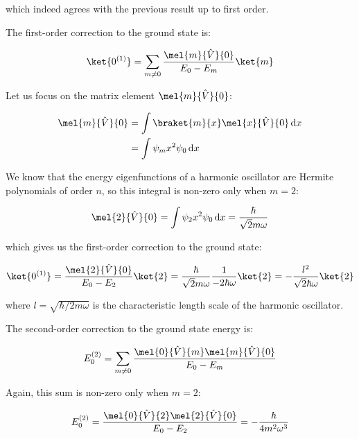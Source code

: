 \documentclass[12pt]{article}
\begin{document}
which indeed agrees with the previous result up to first order.

The first-order correction to the ground state is:

\begin{equation}
    \ket{0^{(1)}} = \sum_{m \ne 0} \frac{\mel{m}{\hat{V}}{0}}{E_{0} - E_{m}} \ket{m}
\end{equation}

Let us focus on the matrix element $\mel{m}{\hat{V}}{0}$:

\begin{equation}
    \begin{split}
        \mel{m}{\hat{V}}{0} &= \int \braket{m}{x} \mel{x}{\hat{V}}{0} \, \mathrm{d}x \\
        &= \int \psi_{m} x^{2} \psi_{0} \, \mathrm{d}x
    \end{split}
\end{equation}

We know that the energy eigenfunctions of a harmonic oscillator are Hermite polynomials of order $n$, so this integral is non-zero only when $m = 2$:

\begin{equation}
    \mel{2}{\hat{V}}{0} = \int \psi_{2} x^{2} \psi_{0} \, \mathrm{d}x = \frac{\hbar}{\sqrt{2}m\omega}
\end{equation}

which gives us the first-order correction to the ground state:

\begin{equation}
    \ket{0^{(1)}} = \frac{\mel{2}{\hat{V}}{0}}{E_{0} - E_{2}} \ket{2} = \frac{\hbar}{\sqrt{2}m\omega} \frac{1}{-2\hbar\omega} \ket{2} = -\frac{l^{2}}{\sqrt{2}\hbar \omega} \ket{2}
\end{equation}

where $l = \sqrt{\hbar/2m\omega}$ is the characteristic length scale of the harmonic oscillator.

The second-order correction to the ground state energy is:

\begin{equation}
    E_{0}^{(2)} = \sum_{m \ne 0} \frac{\mel{0}{\hat{V}}{m} \mel{m}{\hat{V}}{0}}{E_{0} - E_{m}}
\end{equation}

Again, this sum is non-zero only when $m = 2$:

\begin{equation}
    E_{0}^{(2)} = \frac{\mel{0}{\hat{V}}{2} \mel{2}{\hat{V}}{0}}{E_{0} - E_{2}} = -\frac{\hbar}{4m^{2}\omega^{3}}
\end{equation}
\end{document}
